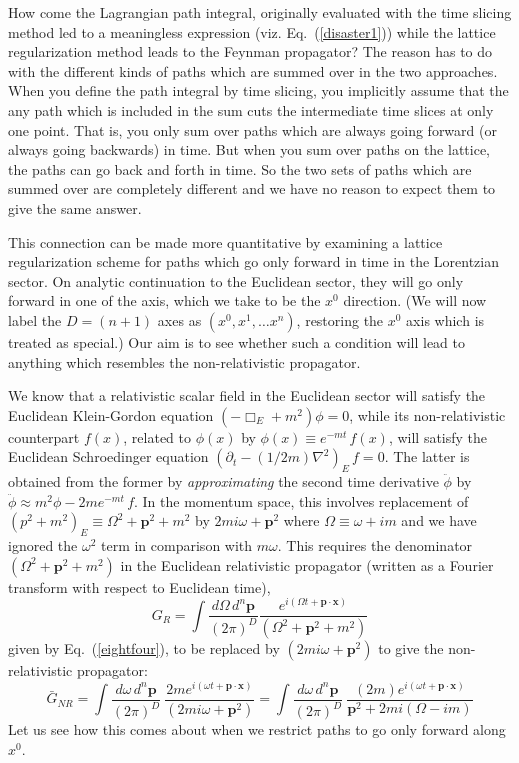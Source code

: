 \documentclass{article}
\def\eq#1{{Eq.~(\ref{#1})}}
\begin{document}
How come the Lagrangian path integral, originally evaluated with the time slicing method led to a meaningless expression (viz. \eq{disaster1}) while the lattice regularization method leads to the Feynman propagator? The reason has to do with the different kinds of paths which are summed over in the two approaches. When you define the path integral by time slicing, you implicitly assume that the any path which is included in the sum cuts the intermediate time slices at only one point. That is, you only sum over paths which are always going forward (or always going backwards) in time. But when you sum over paths on the lattice, the paths can go back and forth in time. So the two sets of paths which are summed over are completely different and we have no reason to expect them to give the same answer.


This connection can be made more quantitative by examining a lattice regularization scheme for paths which go only forward in time in the Lorentzian sector. On analytic continuation to the Euclidean sector, they will go only forward in one of the axis, which we take to be the $x^0$ direction. 
(We will now label the $D=(n+1)$ axes as $(x^0, x^1, \ldots x^n)$, restoring the $x^0$ axis which is treated as special.)
Our aim is to see whether such a condition will lead to anything which resembles the non-relativistic propagator.

We know that a relativistic scalar field in the Euclidean sector will satisfy the Euclidean Klein-Gordon equation 
$
(-\Box_E + m^2)\phi =0
$, 
while its non-relativistic counterpart $f(x)$, related to $\phi(x)$ by 
$
\phi(x) \equiv e^{-mt}\, f(x)
$, 
will satisfy the Euclidean Schroedinger equation 
$
(\partial_t - (1/2m)\nabla^2)_E \, f=0
$.
 The latter is obtained from the former by \textit{approximating} the second time derivative $\ddot \phi$ by 
$
\ddot \phi \approx m^2 \phi - 2 me^{-mt} \, f
$.
In the momentum space, this involves replacement of
$
({p}^2 + m^2)_E \equiv \Omega^2 +\bm{p}^2 + m^2 
$ 
by
$
2mi\omega + \bm{p}^2
$ 
where
$
\Omega \equiv \omega + i m
$ 
and we have ignored the $\omega^2$ term in comparison with $m\omega$. This requires the  denominator $(\Omega^2 + \bm{p}^2+ m^2)$ in the Euclidean relativistic propagator (written as a Fourier transform with respect to Euclidean time), 
\begin{equation}
 G_R = \int \frac{d\Omega \, d^n \bm{p}}{(2\pi)^D} \frac{e^{i(\Omega t + \bm{p\cdot x})}}{(\Omega^2 + \bm{p}^2+ m^2)}
\end{equation} 
 given by \eq{eightfour}, to be replaced by $(2mi\omega + \bm{p}^2)$ to give the non-relativistic propagator:
\begin{equation}
 \bar{G}_{NR} = \int \frac{d\omega \,d^n \bm{p}}{(2\pi)^D}\ \frac{2me^{i(\omega t + \bm{p\cdot x})}}{(2mi\omega + \bm{p}^2)}
 =  \int \frac{d\omega \,d^n \bm{p}}{(2\pi)^D}\ \frac{(2m)e^{i(\omega t + \bm{p\cdot x})}}{ \bm{p}^2+2mi(\Omega -im)}
 \label{14oct9}
\end{equation} 
Let us see how this comes about when we restrict paths to go only forward along $x^0$.
\end{document}
